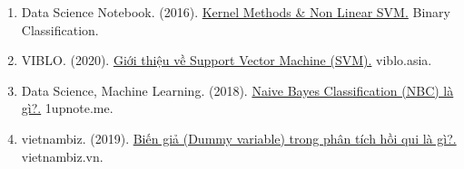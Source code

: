 \documentclass{report}
\begin{document}
\begin{enumerate}
            \item Data Science Notebook. (2016). \href{ https://sites.google.com/site/datasciencenotebook1/binary-classification/kernel-methods}{Kernel Methods \& Non Linear SVM.} Binary Classification.
            \item VIBLO. (2020). \href{https://viblo.asia/p/gioi-thieu-ve-support-vector-machine-svm-6J3ZgPVElmB?fbclid=IwAR2CmZvQt0Ke_3-6liQslGTPMRzn3qUS0h1CGf0jbFGhtw22vPDgCAWVVfM}{Giới thiệu về Support Vector Machine (SVM).} viblo.asia.
            \item Data Science, Machine Learning. (2018). \href{https://1upnote.me/post/2018/11/ds-ml-naive-bayes/}{Naive Bayes Classification (NBC) là gì?.} 1upnote.me.
            \item vietnambiz. (2019). \href{https://vietnambiz.vn/bien-gia-dummy-variable-trong-phan-tich-hoi-qui-la-gi-20191216174659595.htm}{Biến giả (Dummy variable) trong phân tích hồi qui là gì?.} vietnambiz.vn.
        \end{enumerate}
\end{document}
